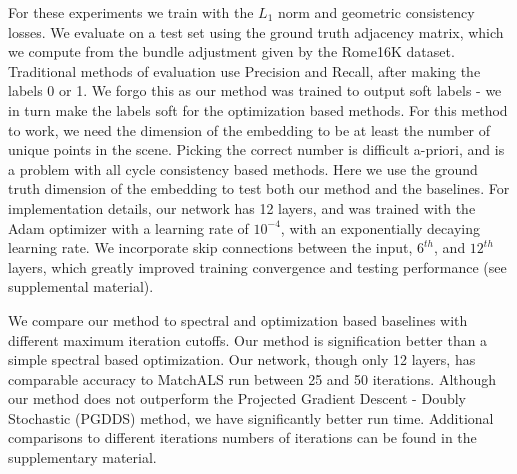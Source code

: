 \documentclass[10pt,twocolumn,letterpaper]{article}
\begin{document}
For these experiments we train with the $L_1$ norm and geometric consistency losses.
We evaluate on a test set using the ground truth adjacency matrix, which we compute from the bundle adjustment given by the Rome16K dataset.
Traditional methods of evaluation use Precision and Recall, after making the labels 0 or 1.
We forgo this as our method was trained to output soft labels - we in turn make the labels soft for the optimization based methods.
For this method to work, we need the dimension of the embedding to be at least the number of unique points in the scene.
Picking the correct number is difficult a-priori, and is a problem with all cycle consistency based methods.
Here we use the ground truth dimension of the embedding to test both our method and the baselines.
For implementation details, our network has 12 layers, and was trained with the Adam optimizer \cite{kingma2014adam} with a learning rate of $10^{-4}$, with an exponentially decaying learning rate. We incorporate skip connections between the input, $6^{th}$, and $12^{th}$ layers, which greatly improved training convergence and testing performance (see supplemental material). 

We compare our method to spectral and optimization based baselines with different maximum iteration cutoffs.
Our method is signification better than a simple spectral based optimization.
Our network, though only 12 layers, has comparable accuracy to MatchALS \cite{zhou2015multi} run between 25 and 50 iterations.
Although our method does not outperform the Projected Gradient Descent - Doubly Stochastic (PGDDS) \cite{leonardos2016distributed} method, we have significantly better run time.
Additional comparisons to different iterations numbers of iterations can be found in the supplementary material.
\end{document}
